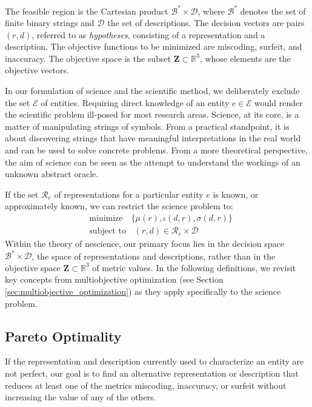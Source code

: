 The feasible region is the Cartesian product $\mathcal{B}^\ast \times \mathcal{D}$, where $\mathcal{B}^\ast$ denotes the set of finite binary strings and $\mathcal{D}$ the set of descriptions. The decision vectors are pairs $(r, d)$, referred to as \emph{hypotheses}, consisting of a representation and a description. The objective functions to be minimized are miscoding, surfeit, and inaccuracy. The objective space is the subset $\mathbf{Z} \subset \mathbb{R}^3$, whose elements are the objective vectors.

In our formulation of science and the scientific method, we deliberately exclude the set $\mathcal{E}$ of entities. Requiring direct knowledge of an entity $e \in \mathcal{E}$ would render the scientific problem ill-posed for most research areas. Science, at its core, is a matter of manipulating strings of symbols. From a practical standpoint, it is about discovering strings that have meaningful interpretations in the real world and can be used to solve concrete problems. From a more theoretical perspective, the aim of science can be seen as the attempt to understand the workings of an unknown abstract oracle.

If the set $\mathcal{R}_e$ of representations for a particular entity $e$ is known, or approximately known, we can restrict the science problem to:
\begin{align*}
 & \text{minimize} \quad \{ \mu(r), \iota(d, r), \sigma(d, r)\} \\
 & \text{subject to} \quad (r, d) \in \mathcal{R}_e \times \mathcal{D}
\end{align*}
Within the theory of nescience, our primary focus lies in the decision space $\mathcal{B}^\ast \times \mathcal{D}$, the space of representations and descriptions, rather than in the objective space $\mathbf{Z} \subset \mathbb{R}^3$ of metric values. In the following definitions, we revisit key concepts from multiobjective optimization (see Section \ref{sec:multiobjective_optimization}) as they apply specifically to the science problem.

\subsection*{Pareto Optimality}

If the representation and description currently used to characterize an entity are not perfect, our goal is to find an alternative representation or description that reduces at least one of the metrics miscoding, inaccuracy, or surfeit without increasing the value of any of the others.

